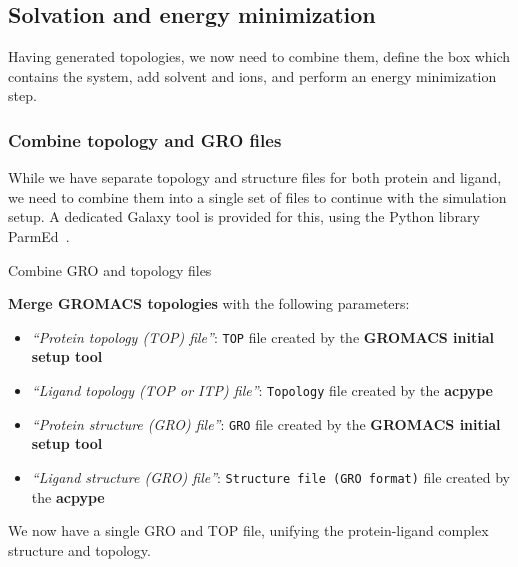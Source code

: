 \documentclass[twocolumn]{bmcart}%
\providecommand{\tightlist}{%
  \setlength{\itemsep}{0pt}\setlength{\parskip}{0pt}}
\begin{document}
\subsection*{Solvation and energy
minimization}\label{solvation-and-energy-minimization}

Having generated topologies, we now need to combine them, define the box
which contains the system, add solvent and ions, and perform an energy
minimization step.

\subsubsection*{Combine topology and GRO
files}\label{combine-topology-and-gro-files}

While we have separate topology and structure files for both protein and ligand, we need to combine them into a single set of files to continue with the simulation setup. A dedicated Galaxy tool is provided for this, using the Python library ParmEd~\cite{Swails2016}.

\begin{handson_box_colour}{Combine GRO and topology files}

  \textbf{Merge GROMACS topologies} with the following
  parameters:

  \begin{itemize}
  \tightlist
  \item
    \emph{``Protein topology (TOP) file''}: \texttt{TOP} file created by the \textbf{GROMACS initial setup tool}
  \item
    \emph{``Ligand topology (TOP or ITP) file''}: \texttt{Topology} file created by the \textbf{acpype}
  \item
    \emph{``Protein structure (GRO) file''}: \texttt{GRO} file created by the \textbf{GROMACS initial setup tool}
  \item
    \emph{``Ligand structure (GRO) file''}: \texttt{Structure file (GRO format)} file created by the \textbf{acpype}

  \end{itemize}

\end{handson_box_colour}

We now have a single GRO and TOP file, unifying the protein-ligand complex structure and topology.
\end{document}
